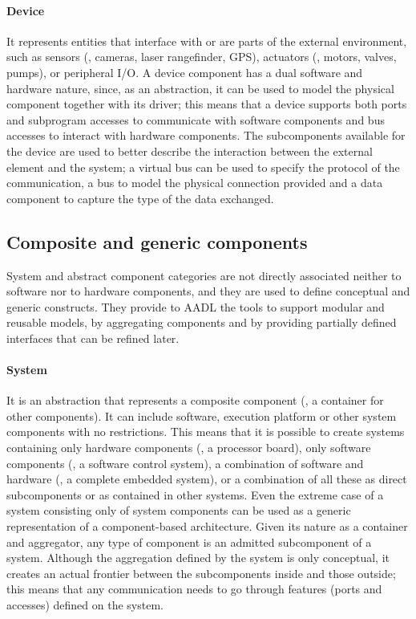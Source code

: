 \paragraph{Device} It represents entities that interface with or are parts of the external environment, such as sensors (\eg, cameras, laser rangefinder, GPS), actuators (\eg, motors, valves, pumps), or peripheral I/O. A device component has a dual software and hardware nature, since, as an abstraction, it can be used to model the physical component together with its driver; this means that a device supports both ports and subprogram accesses to communicate with software components and bus accesses to interact with hardware components. The subcomponents available for the device are used to better describe the interaction between the external element and the system; a virtual bus can be used to specify the protocol of the communication, a bus to model the physical connection provided and a data component to capture the type of the data exchanged.

\subsection[Composite and generic components]{Composite and generic components}
System and abstract component categories are not directly associated neither to software nor to hardware components, and they are used to define conceptual and generic constructs. They provide to AADL the tools to support modular and reusable models, by aggregating components and by providing partially defined interfaces that can be refined later.

\paragraph{System} It is an abstraction that represents a composite component (\ie, a container for other components). It can include software, execution platform or other system components with no restrictions. This means that it is possible to create systems containing only hardware components (\eg, a processor board), only software components (\eg, a software control system), a combination of software and hardware (\eg, a complete embedded system),  or a combination of all these as direct subcomponents or as contained in other systems. Even the extreme case of a system consisting only of system components can be used as a generic representation of a component-based architecture. Given its nature as a container and aggregator, any type of component is an admitted subcomponent of a system. Although the aggregation defined by the system is only conceptual, it creates an actual frontier between the subcomponents inside and those outside; this means that any communication needs to go through features (\ie ports and accesses) defined on the system.

